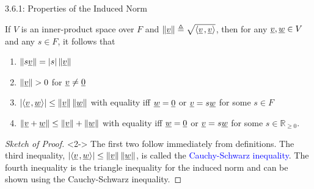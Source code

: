\documentclass[10pt,english,aspectratio=169]{beamer}
\begin{document}
\begin{frame}{3.6.1: Properties of the Induced Norm}

\begin{theorem}
If $V$ is an inner-product space over $F$ and $\| \underline{v} \| \triangleq \sqrt{{\left\langle  \underline{v}  \mskip2mu ,  \underline{v}  \right\rangle}}$, then for any $\underline{v}, \underline{w} \in V$ and any $s\in F$, it follows that
\begin{enumerate}
\item $\left\| s \underline{v} \right\| = |s| \left\| \underline{v} \right\|$
\item $\left\| \underline{v} \right\| > 0$ for $\underline{v} \neq \underline{0}$
\item $\left| {\left\langle  \underline{v}  \mskip2mu ,  \underline{w}  \right\rangle} \right| \leq \left\| \underline{v} \right\| \left\| \underline{w} \right\|$ with equality iff $\underline{w}=\underline{0}$ or $\underline{v} = s \underline{w}$ for some $s\in F$
\item $\left\| \underline{v} + \underline{w} \right\| \leq \left\| \underline{v} \right\| + \left\| \underline{w} \right\|$ with equality iff $\underline{w}=\underline{0}$ or $\underline{v} = s \underline{w}$ for some $s\in\mathbb{R}_{\geq0}$.
\end{enumerate}
\end{theorem}

\begin{proof}[Sketch of Proof]<2->
The first two follow immediately from definitions.
The third inequality, $\left| {\left\langle  \underline{v}  \mskip2mu ,  \underline{w}  \right\rangle} \right| \leq \left\| \underline{v} \right\| \left\| \underline{w} \right\|$, is called the \textcolor{blue}{Cauchy-Schwarz inequality}.
The fourth inequality is the triangle inequality for the induced norm and can be shown using the Cauchy-Schwarz inequality.
\end{proof}


\end{frame}
\end{document}
